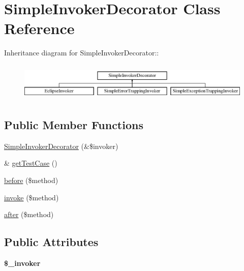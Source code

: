 \hypertarget{class_simple_invoker_decorator}{
\section{SimpleInvokerDecorator Class Reference}
\label{class_simple_invoker_decorator}
}
Inheritance diagram for SimpleInvokerDecorator::\begin{figure}[H]
\begin{center}
\leavevmode
\includegraphics[height=1.83007cm]{class_simple_invoker_decorator}
\end{center}
\end{figure}
\subsection*{Public Member Functions}
\begin{DoxyCompactItemize}
\item 
\hyperlink{class_simple_invoker_decorator_a29f5d5512d26f640e9587503269b639b}{SimpleInvokerDecorator} (\&\$invoker)
\item 
\& \hyperlink{class_simple_invoker_decorator_a621cdedf65d9a2fc0a4ce35e475a720b}{getTestCase} ()
\item 
\hyperlink{class_simple_invoker_decorator_affaed9e6d8d366064589bbcdae7a6f15}{before} (\$method)
\item 
\hyperlink{class_simple_invoker_decorator_a95431eef2d336fc92dbbc719a66cda32}{invoke} (\$method)
\item 
\hyperlink{class_simple_invoker_decorator_a7b4b69f4e499f4e15c52e57542c52d7e}{after} (\$method)
\end{DoxyCompactItemize}
\subsection*{Public Attributes}
\begin{DoxyCompactItemize}
\item 
\hypertarget{class_simple_invoker_decorator_a07f6f15a8493b6c24f481a7a0c3ebba8}{
{\bfseries \$\_\-invoker}}
\label{class_simple_invoker_decorator_a07f6f15a8493b6c24f481a7a0c3ebba8}

\end{DoxyCompactItemize}



